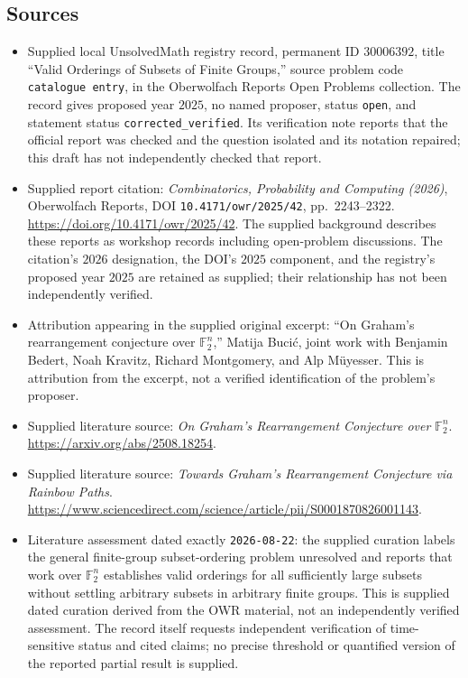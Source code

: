 \documentclass[11pt]{article}
\newcommand{\F}{\mathbb{F}}
\begin{document}
\subsection{Sources}
\begin{itemize}
\item Supplied local UnsolvedMath registry record, permanent ID \(30006392\), title ``Valid Orderings of Subsets of Finite Groups,'' source problem code \texttt{catalogue entry}, in the Oberwolfach Reports Open Problems collection. The record gives proposed year \(2025\), no named proposer, status \texttt{open}, and statement status \texttt{corrected\_verified}. Its verification note reports that the official report was checked and the question isolated and its notation repaired; this draft has not independently checked that report.
\item Supplied report citation: \emph{Combinatorics, Probability and Computing (2026)}, Oberwolfach Reports, DOI \texttt{10.4171/owr/2025/42}, pp.~2243--2322. \url{https://doi.org/10.4171/owr/2025/42}. The supplied background describes these reports as workshop records including open-problem discussions. The citation's \(2026\) designation, the DOI's \(2025\) component, and the registry's proposed year \(2025\) are retained as supplied; their relationship has not been independently verified.
\item Attribution appearing in the supplied original excerpt: ``On Graham's rearrangement conjecture over \(\F_2^n\),'' Matija Buci\'{c}, joint work with Benjamin Bedert, Noah Kravitz, Richard Montgomery, and Alp M\"uyesser. This is attribution from the excerpt, not a verified identification of the problem's proposer.
\item Supplied literature source: \emph{On Graham's Rearrangement Conjecture over \(\F_2^n\)}. \url{https://arxiv.org/abs/2508.18254}.
\item Supplied literature source: \emph{Towards Graham's Rearrangement Conjecture via Rainbow Paths}. \url{https://www.sciencedirect.com/science/article/pii/S0001870826001143}.
\item Literature assessment dated exactly \texttt{2026-08-22}: the supplied curation labels the general finite-group subset-ordering problem unresolved and reports that work over \(\F_2^n\) establishes valid orderings for all sufficiently large subsets without settling arbitrary subsets in arbitrary finite groups. This is supplied dated curation derived from the OWR material, not an independently verified assessment. The record itself requests independent verification of time-sensitive status and cited claims; no precise threshold or quantified version of the reported partial result is supplied.
\end{itemize}
\end{document}
